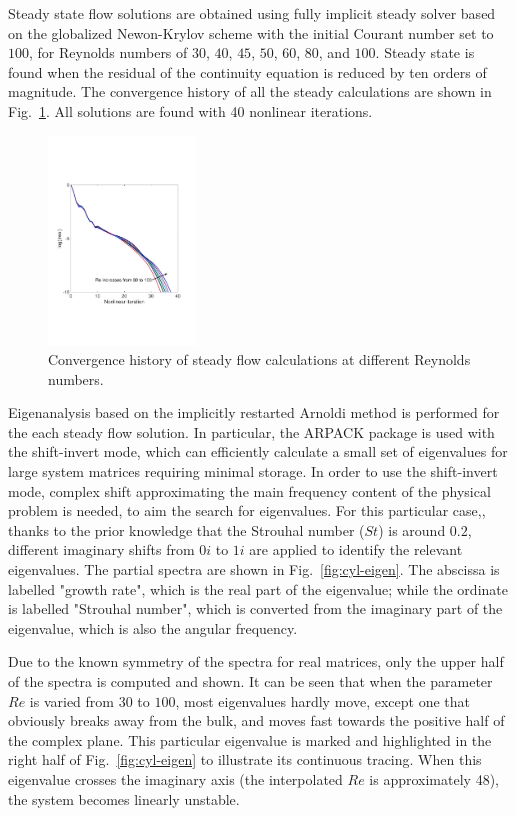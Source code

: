 \documentclass[journal,final]{new-aiaa}
\begin{document}
Steady state flow solutions are obtained using fully implicit
steady solver based on the globalized Newon-Krylov scheme with the
initial Courant number set to $100$, for
Reynolds numbers of $30$, $40$, $45$, $50$, $60$, $80$, and $100$.
Steady state is found when the residual of the continuity equation
is reduced by ten orders of magnitude. The convergence history of
all the steady calculations are shown in Fig.~\ref{fig:cyl-std}.
All solutions are found with 40 nonlinear iterations.


\begin{figure}[htb]
	\centering   
	\includegraphics[width=0.35\textwidth]{cyl-std-conv.pdf}
	\caption{Convergence history of steady flow calculations
		at different Reynolds numbers.}
	\label{fig:cyl-std}
\end{figure}

Eigenanalysis based on the implicitly restarted Arnoldi method
is performed for the each steady flow solution. In particular,
the ARPACK package is used with the shift-invert mode, which can
efficiently calculate a small set of eigenvalues for large system
matrices requiring minimal storage. In order to use the shift-invert
mode, complex shift approximating the main frequency content of the
physical problem is needed, to aim the search for eigenvalues.
For this particular case,, thanks to the prior knowledge that
the Strouhal number ($St$) is around $0.2$, different imaginary
shifts from $0i$ to $1i$ are applied to identify the relevant
eigenvalues. The partial spectra
are shown in Fig.~\ref{fig:cyl-eigen}. The abscissa is labelled
"growth rate", which is the real part of the eigenvalue; while
the ordinate is labelled "Strouhal number", which is converted
from the imaginary part of the eigenvalue, which is also the
angular frequency.

Due to the known symmetry of the spectra for real matrices,
only the upper half of the spectra is computed and shown.
It can be seen that when the parameter $Re$ is varied from
$30$ to $100$, most eigenvalues hardly move, except one
that obviously breaks away from the bulk, and moves fast
towards the positive half of the complex plane. This
particular eigenvalue is marked and highlighted in the
right half of Fig.~\ref{fig:cyl-eigen} to illustrate its
continuous tracing. When this eigenvalue crosses the
imaginary axis (the interpolated $Re$ is approximately
48), the system becomes linearly unstable.
\end{document}
